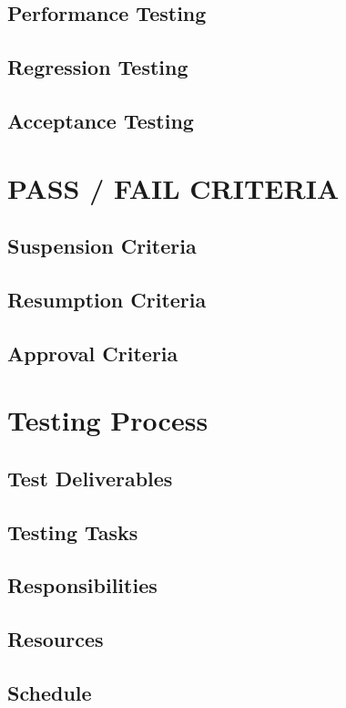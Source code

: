 \documentclass[a4paper,12pt,titlepage,margin=1in]{article}
\begin{document}
	\subsection{Performance Testing}
	\subsection{Regression Testing}
	\subsection{Acceptance Testing}
	
\section{PASS / FAIL CRITERIA}
	\subsection{Suspension Criteria}
	\subsection{Resumption Criteria}
	\subsection{Approval Criteria}
		
\section{Testing Process}
	\subsection{Test Deliverables}
	\subsection{Testing Tasks}
	\subsection{Responsibilities}
	\subsection{Resources}
	\subsection{Schedule}
	
\end{document}
